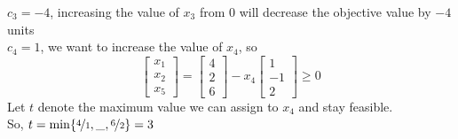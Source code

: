$c_3=-4$, increasing the value of $x_3$ from $0$ will decrease the objective value by $-4$ units\\
$c_4=1$, we want to increase the value of $x_4$, so
\[
    \begin{bmatrix}
        x_1\\
        x_2\\
        x_5
    \end{bmatrix}
    =
    \begin{bmatrix}
        4\\
        2\\
        6
    \end{bmatrix}
    -x_4
    \begin{bmatrix}
        1\\
        -1\\
        2
    \end{bmatrix}
    \ge 0
\]
Let $t$ denote the maximum value we can assign to $x_4$ and stay feasible.\\
So,
$t=\min\{\nicefrac{4}{1},\_,\nicefrac{6}{2}\}=3$